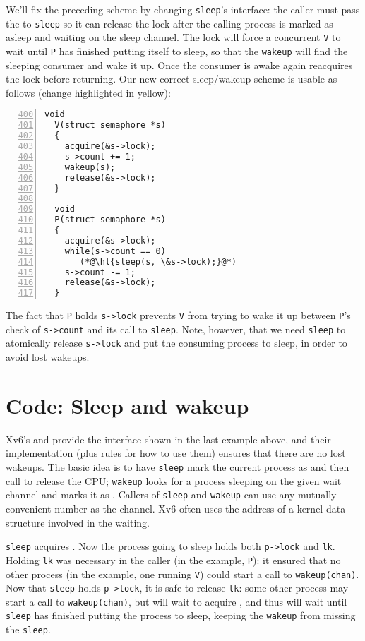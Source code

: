 We'll fix the preceding scheme by changing
\lstinline{sleep}'s
interface:
the caller must pass the  to
\lstinline{sleep}
so it can release the lock after
the calling process is marked as asleep and waiting on the
sleep channel.
The lock will force a concurrent
\lstinline{V}
to wait until \lstinline{P} has finished putting itself to sleep,
so that the
\lstinline{wakeup}
will find the sleeping consumer and wake it up.
Once the consumer is awake again
reacquires the lock before returning.
Our new correct sleep/wakeup scheme is usable as follows (change
highlighted in yellow):
\begin{lstlisting}[numbers=left,firstnumber=400]
  void
  V(struct semaphore *s)
  {
    acquire(&s->lock);
    s->count += 1;
    wakeup(s);
    release(&s->lock);
  }

  void
  P(struct semaphore *s)
  {
    acquire(&s->lock);
    while(s->count == 0)
       (*@\hl{sleep(s, \&s->lock);}@*)
    s->count -= 1;
    release(&s->lock);
  }
\end{lstlisting}

The fact that
\lstinline{P}
holds
\lstinline{s->lock}
prevents 
\lstinline{V}
from trying to wake it up between 
\lstinline{P}'s
check of
\lstinline{s->count}
and its call to
\lstinline{sleep}.
Note, however, that we need
\lstinline{sleep}
to atomically release
\lstinline{s->lock}
and put the consuming process to sleep,
in order to avoid lost wakeups.

\section{Code: Sleep and wakeup}

Xv6's
and
provide the interface shown in the last example above,
and their implementation (plus rules for how to use them)
ensures that there are no lost wakeups.
The basic idea is to have
\lstinline{sleep}
mark the current process as
and then call
to release the CPU;
\lstinline{wakeup}
looks for a process sleeping on the given wait channel
and marks it as 
.
Callers of
\lstinline{sleep}
and
\lstinline{wakeup}
can use any mutually convenient number as the channel.
Xv6 often uses the address
of a kernel data structure involved in the waiting.

\lstinline{sleep}
acquires 
.
Now the process going to sleep holds both
\lstinline{p->lock}
and
\lstinline{lk}.
Holding
\lstinline{lk}
was necessary in the caller (in the example,
\lstinline{P}):
it
ensured that no other process (in the example,
one running
\lstinline{V})
could start a call to
\lstinline{wakeup(chan)}.
Now that
\lstinline{sleep}
holds
\lstinline{p->lock},
it is safe to release
\lstinline{lk}:
some other process may start a call to
\lstinline{wakeup(chan)},
but
will wait to acquire
,
and thus will wait until
\lstinline{sleep}
has finished putting the process to sleep,
keeping the
\lstinline{wakeup}
from missing the
\lstinline{sleep}.


